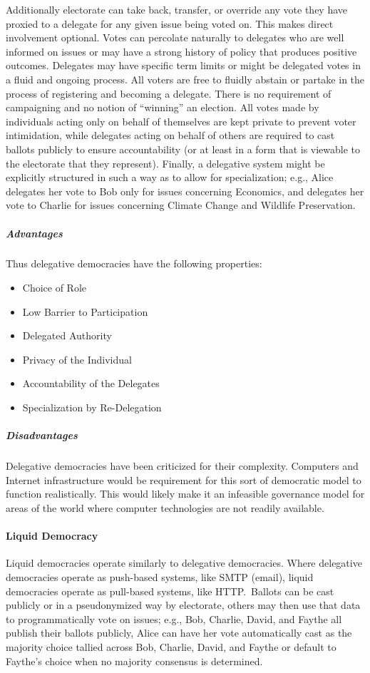 Additionally electorate can take back, transfer, or override any vote they have
proxied to a delegate for any given issue being voted on. This makes direct
involvement optional. Votes can percolate naturally to delegates who are well
informed on issues or may have a strong history of policy that produces positive
outcomes. Delegates may have specific term limits or might be delegated votes in
a fluid and ongoing process. All voters are free to fluidly abstain or partake
in the process of registering and becoming a delegate. There is no requirement
of campaigning and no notion of ``winning'' an election. All votes made by
individuals acting only on behalf of themselves are kept private to prevent
voter intimidation, while delegates acting on behalf of others are required to
cast ballots publicly to ensure accountability (or at least in a form that is
viewable to the electorate that they represent). Finally, a delegative system
might be explicitly structured in such a way as to allow for specialization;
e.g., Alice delegates her vote to Bob only for issues concerning Economics, and
delegates her vote to Charlie for issues concerning Climate Change and Wildlife
Preservation.

\subparagraph{Advantages}
Thus delegative democracies have the following properties:

\begin{itemize}
    \item Choice of Role
    \item Low Barrier to Participation
    \item Delegated Authority
    \item Privacy of the Individual
    \item Accountability of the Delegates
    \item Specialization by Re-Delegation
\end{itemize}

\subparagraph{Disadvantages}
Delegative democracies have been criticized for their complexity. Computers and
Internet infrastructure would be requirement for this sort of democratic model
to function realistically. This would likely make it an infeasible governance
model for areas of the world where computer technologies are not readily
available.

\paragraph{Liquid Democracy}
Liquid democracies operate similarly to delegative democracies. Where delegative
democracies operate as push-based systems, like SMTP (email), liquid democracies
operate as pull-based systems, like HTTP.\ Ballots can be cast publicly or in a
pseudonymized way by electorate, others may then use that data to
programmatically vote on issues; e.g., Bob, Charlie, David, and Faythe all
publish their ballots publicly, Alice can have her vote automatically cast as
the majority choice tallied across Bob, Charlie, David, and Faythe or default to
Faythe's choice when no majority consensus is determined.

